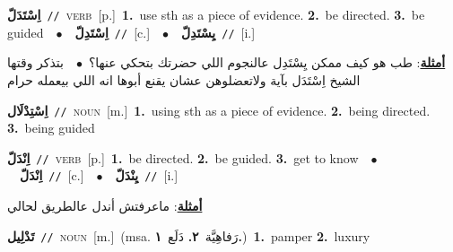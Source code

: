 \documentclass[10pt,a4paper,twoside]{article} %
\begin{document}
\begin{multicols}{2}
{\setlength\topsep{0pt}\textbf{\foreignlanguage{arabic}{اِسْتَدَلّ}}\ {\color{gray}\texttt{//}\color{black}}\ \textsc{verb}\ [p.]\ \textbf{1.}~use sth as a piece of evidenceُ.  \textbf{2.}~be directed.  \textbf{3.}~be guided\ \ $\bullet$\ \ \setlength\topsep{0pt}\textbf{\foreignlanguage{arabic}{اِسْتَدِلّ}}\ {\color{gray}\texttt{//}\color{black}}\ [c.]\ \ $\bullet$\ \ \setlength\topsep{0pt}\textbf{\foreignlanguage{arabic}{يِسْتَدِلّ}}\ {\color{gray}\texttt{//}\color{black}}\ [i.]\  \begin{flushright}\color{gray}\foreignlanguage{arabic}{\textbf{\underline{\foreignlanguage{arabic}{أمثلة}}}: طب هو كيف ممكن يِسْتَدِل عالنجوم اللي حضرتك بتحكي عنها؟\ $\bullet$\ \  بتذكر وقتها الشيخ اِسْتَدَل بآية ولاتعضلوهن عشان يقنع أبوها انه اللي بيعمله حرام}\end{flushright}\color{black}} \vspace{2mm}

{\setlength\topsep{0pt}\textbf{\foreignlanguage{arabic}{اِسْتِدْلَال}}\ {\color{gray}\texttt{//}\color{black}}\ \textsc{noun}\ [m.]\ \textbf{1.}~using sth as a piece of evidence.  \textbf{2.}~being directed.  \textbf{3.}~being guided\ } \vspace{2mm}

{\setlength\topsep{0pt}\textbf{\foreignlanguage{arabic}{اِنْدَلّ}}\ {\color{gray}\texttt{//}\color{black}}\ \textsc{verb}\ [p.]\ \textbf{1.}~be directed.  \textbf{2.}~be guided.  \textbf{3.}~get to know\ \ $\bullet$\ \ \setlength\topsep{0pt}\textbf{\foreignlanguage{arabic}{اِنْدَلّ}}\ {\color{gray}\texttt{//}\color{black}}\ [c.]\ \ $\bullet$\ \ \setlength\topsep{0pt}\textbf{\foreignlanguage{arabic}{يِنْدَلّ}}\ {\color{gray}\texttt{//}\color{black}}\ [i.]\  \begin{flushright}\color{gray}\foreignlanguage{arabic}{\textbf{\underline{\foreignlanguage{arabic}{أمثلة}}}: ماعرفتش أندل عالطريق لحالي}\end{flushright}\color{black}} \vspace{2mm}

{\setlength\topsep{0pt}\textbf{\foreignlanguage{arabic}{تَدْلِيل}}\ {\color{gray}\texttt{//}\color{black}}\ \textsc{noun}\ [m.]\ \color{gray}(msa. \foreignlanguage{arabic}{رَفاهِيَّة}~\foreignlanguage{arabic}{\textbf{٢.}}  \foreignlanguage{arabic}{دَلَع}~\foreignlanguage{arabic}{\textbf{١.}})\color{black}\ \textbf{1.}~pamper  \textbf{2.}~luxury\ } \vspace{2mm}


\end{multicols}
\end{document}

